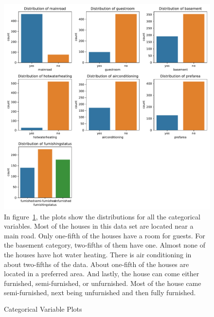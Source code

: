 \documentclass[12pt]{article}
\begin{document}
\begin{figure}
    \caption{Categorical Variable Plots}
    \includegraphics[width=1\textwidth]{categorical_plots.pdf}
    \label{fig:categorical_plots}
In figure~\ref{fig:categorical_plots}, the plots show the distributions for all the categorical variables. Most of the houses in this data set are located near a main road. Only one-fifth of the houses have a room for guests. For the basement category, two-fifths of them have one. Almost none of the houses have hot water heating. There is air conditioning in about two-fifths of the data. About one-fifth of the houses are located in a preferred area. And lastly, the house can come either furnished, semi-furnished, or unfurnished. Most of the house came semi-furnished, next being unfurnished and then fully furnished. 
\end{figure}
\end{document}
